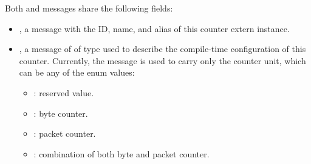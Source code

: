 \documentclass[11pt]{article}
\begin{document}
{%
\noindent{}Both  and  messages share the following fields:%

\begin{itemize}%

\item{}
, a  message with the ID, name, and alias of this counter
extern instance.%

\item{}
, a message of of type  used to describe the compile-time
configuration of this counter. Currently, the  message is used to
carry only the counter unit, which can be any of the  enum
values:%

\begin{itemize}[noitemsep,topsep=\mdcompacttopsep]%

\item{}: reserved value.%

\item{}: byte counter.%

\item{}: packet counter.%

\item{}: combination of both byte and packet counter.%
\end{itemize}%
\end{itemize}%

}
\end{document}
